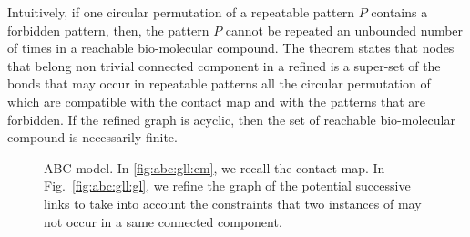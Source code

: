 \documentclass{entcs}
\begin{document}
Intuitively, if one circular permutation of a repeatable pattern $P$ contains a forbidden pattern, then, the pattern $P$ cannot be repeated an unbounded number of times in a reachable bio-molecular compound. The theorem states that
nodes that belong non trivial connected component in a refined
is a super-set of the bonds that may occur in repeatable patterns all the circular permutation of which are compatible with the contact map and with the patterns that are forbidden. If the refined graph is acyclic, then
the set of reachable bio-molecular compound is necessarily finite.

\begin{figure}
 \caption{ABC model. In \ref{fig:abc:gll:cm}, we recall the contact map.
 In Fig.~\ref{fig:abc:gll:gl}, we refine the graph of the potential successive links to take into account the constraints that two instances of  may not occur in a same connected component. }
  \label{fig:abc:gll}
\end{figure}
\end{document}
